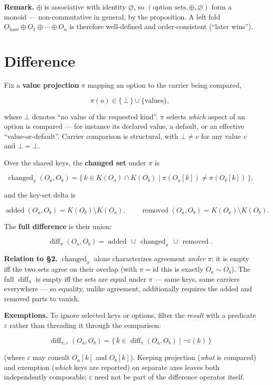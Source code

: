 \documentclass[11pt]{article}
\begin{document}
\textbf{Remark.} \(\oplus\) is associative with identity \(\varnothing\), so \((\text{option sets}, \oplus, \varnothing)\) form a monoid --- non-commutative in general, by the proposition. A left fold \(O_{\mathrm{base}} \oplus O_1 \oplus \cdots \oplus O_n\) is therefore well-defined and order-consistent (``later wins'').

\section{Difference}

Fix a \textbf{value projection} \(\pi\) mapping an option to the carrier being compared,

\[
\pi(o) \in \{\, \bot \,\} \cup \{\text{values}\},
\]

where \(\bot\) denotes ``no value of the requested kind''. \(\pi\) selects \emph{which} aspect of an option is compared --- for instance its declared value, a default, or an effective ``value-or-default''. Carrier comparison is structural, with \(\bot \neq v\) for any value \(v\) and \(\bot = \bot\).

Over the shared keys, the \textbf{changed set} under \(\pi\) is

\[
\operatorname{changed}_{\pi}(O_a, O_b)
=
\{\, k \in K(O_a) \cap K(O_b) \mid \pi(O_a[k]) \neq \pi(O_b[k]) \,\},
\]

and the key-set delta is

\[
\operatorname{added}(O_a, O_b)   = K(O_b) \setminus K(O_a),
\qquad
\operatorname{removed}(O_a, O_b) = K(O_a) \setminus K(O_b).
\]

The \textbf{full difference} is their union:

\[
\operatorname{diff}_{\pi}(O_a, O_b)
=
\operatorname{added} \,\cup\, \operatorname{changed}_{\pi} \,\cup\, \operatorname{removed}.
\]

\textbf{Relation to \S2.} \(\operatorname{changed}_{\pi}\) alone characterizes agreement \emph{under} \(\pi\): it is empty iff the two sets agree on their overlap (with \(\pi = \mathrm{id}\) this is exactly \(O_a \sim O_b\)). The full \(\operatorname{diff}_{\pi}\) is empty iff the sets are equal under \(\pi\) --- same keys, same carriers everywhere --- so equality, unlike agreement, additionally requires the added and removed parts to vanish.

\textbf{Exemptions.} To ignore selected keys or options, filter the \emph{result} with a predicate \(\varepsilon\) rather than threading it through the comparison:

\[
\operatorname{diff}_{\pi,\varepsilon}(O_a, O_b)
=
\{\, k \in \operatorname{diff}_{\pi}(O_a, O_b) \mid \neg \varepsilon(k) \,\}
\]

(where \(\varepsilon\) may consult \(O_a[k]\) and \(O_b[k]\)). Keeping projection (\emph{what} is compared) and exemption (\emph{which} keys are reported) on separate axes leaves both independently composable; \(\varepsilon\) need not be part of the difference operator itself.
\end{document}
